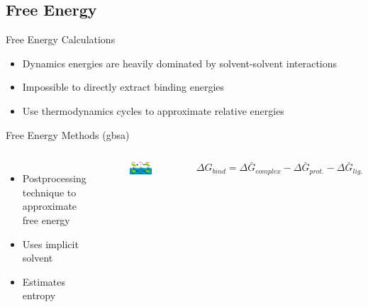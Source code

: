 \subsection{Free Energy}
\begin{frame}{Free Energy Calculations}
\begin{itemize}
	\item Dynamics energies are heavily dominated by solvent-solvent interactions
	\vspace{1 cm}
	\item Impossible to directly extract binding energies
	\vspace{1 cm}
	\item Use thermodynamics cycles to approximate relative energies
\end{itemize}
\end{frame}

\begin{frame}{Free Energy Methods (gbsa)}
\begin{columns}
\begin{itemize}
		\item Postprocessing technique to approximate free energy
		\vspace{1 cm}
		\item Uses implicit solvent
		\vspace{1 cm}
		\item Estimates entropy
\end{itemize}
\begin{figure}
\includegraphics[width=0.95\textwidth]{../Graphics/Theory/gbsa}
\end{figure}
\begin{equation}
        \Delta G_{bind} = \Delta \bar{G}_{complex} - \Delta \bar{G}_{prot.} - \Delta \bar{G}_{lig.}
\end{equation}
\end{columns}
\end{frame}

